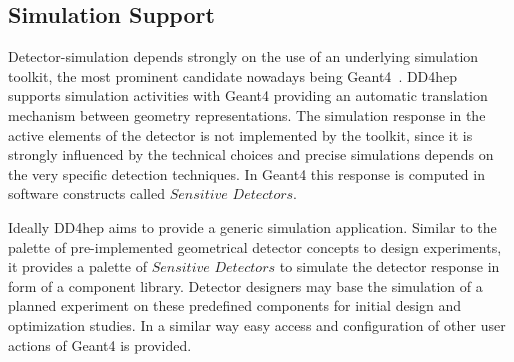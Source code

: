 \subsection{Simulation Support}
\label{subsect:simulation-support}
\noindent
Detector-simulation depends strongly on the use of an underlying simulation toolkit, 
the most prominent candidate nowadays being Geant4~\cite{bib:geant4}.
DD4hep supports simulation activities with Geant4 providing
an automatic translation mechanism between geometry representations.
The simulation response in the active elements of the detector
is not implemented by the toolkit, since it is strongly influenced by the technical 
choices and precise simulations depends on the very specific detection techniques.
In Geant4 this response is computed in software constructs called $Sensitive$ 
$Detectors$.

\noindent
Ideally DD4hep aims to provide a generic simulation application.
Similar to the palette of pre-implemented geometrical detector 
concepts to design experiments, it provides a palette of $Sensitive$
$Detectors$ to simulate the detector response in form of a component library.
Detector designers may base the simulation of a planned experiment 
on these predefined components for initial design and optimization 
studies.  In a similar way easy access
and configuration of other user actions of Geant4 is provided.

